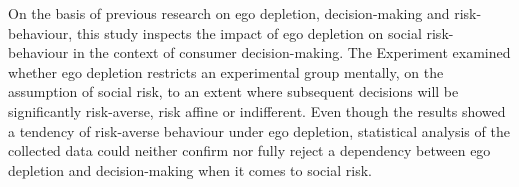 \onehalfspacing
On the basis of previous research on ego depletion, decision-making and risk-behaviour, this study inspects the impact of ego depletion on social risk-behaviour in the context of consumer decision-making. The Experiment examined whether ego depletion restricts an experimental group mentally, on the assumption of social risk, to an extent where subsequent decisions will be significantly risk-averse, risk affine or indifferent. Even though the results showed a tendency of risk-averse behaviour under ego depletion, statistical analysis of the collected data could neither confirm nor fully reject a dependency between ego depletion and decision-making when it comes to social risk.